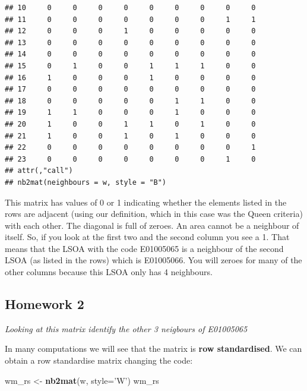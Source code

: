 \documentclass[]{book}
\newenvironment{Shaded}{\begin{snugshade}}{\end{snugshade}}
\newcommand{\DataTypeTok}[1]{\textcolor[rgb]{0.13,0.29,0.53}{#1}}
\newcommand{\KeywordTok}[1]{\textcolor[rgb]{0.13,0.29,0.53}{\textbf{#1}}}
\newcommand{\NormalTok}[1]{#1}
\newcommand{\StringTok}[1]{\textcolor[rgb]{0.31,0.60,0.02}{#1}}
\begin{document}
\begin{verbatim}
## 10     0     0     0     0     0     0     0     0     0
## 11     0     0     0     0     0     0     0     1     1
## 12     0     0     0     1     0     0     0     0     0
## 13     0     0     0     0     0     0     0     0     0
## 14     0     0     0     0     0     0     0     0     0
## 15     0     1     0     0     1     1     1     0     0
## 16     1     0     0     0     1     0     0     0     0
## 17     0     0     0     0     0     0     0     0     0
## 18     0     0     0     0     0     1     1     0     0
## 19     1     1     0     0     0     1     0     0     0
## 20     1     0     0     1     1     0     1     0     0
## 21     1     0     0     1     0     1     0     0     0
## 22     0     0     0     0     0     0     0     0     1
## 23     0     0     0     0     0     0     0     1     0
## attr(,"call")
## nb2mat(neighbours = w, style = "B")
\end{verbatim}

This matrix has values of 0 or 1 indicating whether the elements listed in the rows are adjacent (using our definition, which in this case was the Queen criteria) with each other. The diagonal is full of zeroes. An area cannot be a neighbour of itself. So, if you look at the first two and the second column you see a 1. That means that the LSOA with the code E01005065 is a neighbour of the second LSOA (as listed in the rows) which is E01005066. You will zeroes for many of the other columns because this LSOA only has 4 neighbours.

\hypertarget{homework-2-3}{%
\subsection{Homework 2}\label{homework-2-3}}

\emph{Looking at this matrix identify the other 3 neigbours of E01005065}

In many computations we will see that the matrix is \textbf{row standardised}. We can obtain a row standardise matrix changing the code:

\begin{Shaded}
\begin{Highlighting}[]
\NormalTok{wm_rs <-}\StringTok{ }\KeywordTok{nb2mat}\NormalTok{(w, }\DataTypeTok{style=}\StringTok{'W'}\NormalTok{)}
\NormalTok{wm_rs}
\end{Highlighting}
\end{Shaded}
\end{document}
